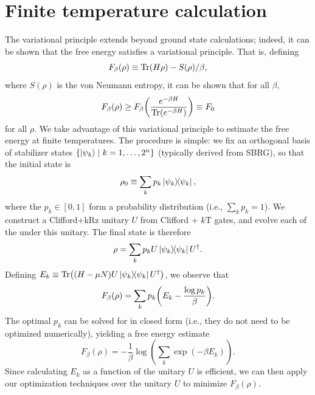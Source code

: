 \documentclass[a4paper,accepted=2024-07-10]{quantumarticle}
\begin{document}
\section{\label{app:finite-temp}Finite temperature calculation}
The variational principle extends beyond ground state calculations; indeed, it can be shown that the free energy satisfies a variational principle. That is, defining
\begin{equation}
    F_\beta(\rho) \equiv \Tr(H \rho) - S(\rho)/\beta,
\end{equation}
where $S(\rho)$ is the von Neumann entropy, it can be shown that for all $\beta$,
\begin{equation}
    F_\beta(\rho) \geq F_\beta\qty(\frac{e^{-\beta H}}{\Tr(e^{-\beta H})}) \equiv F_0
\end{equation}
for all $\rho$. We take advantage of this variational principle to estimate the free energy at finite temperatures. The procedure is simple: we fix an orthogonal basis of stabilizer states $\qty{\ket{\psi_k} \mid k=1,\ldots,2^n}$ (typically derived from SBRG), so that the initial state is
\begin{equation}
    \rho_0 \equiv \sum_k p_k \ketbra{\psi_k},
\end{equation}
where the $p_k \in [0,1]$ form a probability distribution (i.e., $\sum_k p_k = 1$). We construct a Clifford+kRz unitary $U$ from Clifford + $k$T gates, and evolve each of the  under this unitary. The final state is therefore
\begin{equation}
    \rho = \sum_k p_k U\ketbra{\psi_k} U^\dagger.
\end{equation}
Defining $E_k \equiv \Tr((H-\mu N) U \ketbra{\psi_k} U^\dagger)$, we observe that
\begin{equation}
    F_\beta(\rho) = \sum_k p_k \qty(E_k-\frac{\log p_k}{\beta}).
\end{equation}
The optimal $p_k$ can be solved for in closed form (i.e., they do not need to be optimized numerically), yielding a free energy estimate
\begin{equation}
    F_\beta(\rho) = -\frac{1}{\beta} \log(\sum_k \exp(-\beta E_k)).
\end{equation}
Since calculating $E_k$ as a function of the unitary $U$ is efficient, we can then apply our optimization techniques over the unitary $U$ to minimize $F_\beta(\rho)$.
\end{document}
